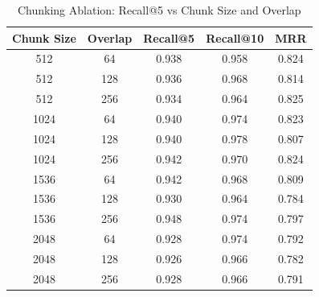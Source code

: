 \begin{table}[t]
\centering
\caption{Chunking Ablation: Recall@5 vs Chunk Size and Overlap}
\label{tab:chunking}
\begin{tabular}{ccccc}
\toprule
Chunk Size & Overlap & Recall@5 & Recall@10 & MRR \\
\midrule
512 & 64 & 0.938 & 0.958 & 0.824 \\
512 & 128 & 0.936 & 0.968 & 0.814 \\
512 & 256 & 0.934 & 0.964 & 0.825 \\
1024 & 64 & 0.940 & 0.974 & 0.823 \\
1024 & 128 & 0.940 & 0.978 & 0.807 \\
1024 & 256 & 0.942 & 0.970 & 0.824 \\
1536 & 64 & 0.942 & 0.968 & 0.809 \\
1536 & 128 & 0.930 & 0.964 & 0.784 \\
1536 & 256 & 0.948 & 0.974 & 0.797 \\
2048 & 64 & 0.928 & 0.974 & 0.792 \\
2048 & 128 & 0.926 & 0.966 & 0.782 \\
2048 & 256 & 0.928 & 0.966 & 0.791 \\
\bottomrule
\end{tabular}
\end{table}
